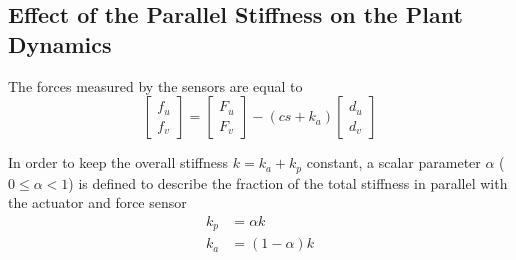 \documentclass{ISMA_USD2020}
\begin{document}
\subsection{Effect of the Parallel Stiffness on the Plant Dynamics}
\label{sec:org6d160ef}
The forces measured by the sensors are equal to
\begin{equation}
\label{eq:measured_force_kp}
  \begin{bmatrix} f_{u} \\ f_{v} \end{bmatrix} =
  \begin{bmatrix} F_u \\ F_v \end{bmatrix} - (c s + k_a)
  \begin{bmatrix} d_u \\ d_v \end{bmatrix}
\end{equation}

In order to keep the overall stiffness \(k = k_a + k_p\) constant, a scalar parameter \(\alpha\) (\(0 \le \alpha < 1\)) is defined to describe the fraction of the total stiffness in parallel with the actuator and force sensor
\begin{subequations}
  \begin{align}
    k_p &= \alpha k \\
    k_a &= (1 - \alpha) k
  \end{align}
\end{subequations}
\end{document}
